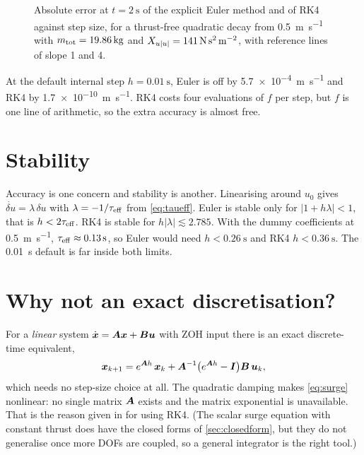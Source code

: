 \begin{figure}[htbp]
\centering
{}
\caption{Absolute error at $t = \qty{2}{\second}$ of the explicit Euler method and of RK4
against step size, for a thrust-free quadratic decay from \qty{0.5}{\meter\per\second} with
$m_\mathrm{tot} = \qty{19.86}{\kilogram}$ and $X_{u|u|} = \qty{141}{\newton\second\squared\per\meter\squared}$,
with reference lines of slope 1 and 4.}
\label{fig:conv}
\end{figure}
\FloatBarrier

At the default internal step $h = \qty{0.01}{\second}$, Euler is off by
\qty{5.7e-4}{\meter\per\second} and RK4 by \qty{1.7e-10}{\meter\per\second}. RK4 costs four
evaluations of $f$ per step, but $f$ is one line of arithmetic, so the extra accuracy is
almost free.

\section{Stability}

Accuracy is one concern and stability is another. Linearising around $u_0$ gives
$\dot{\delta u} = \lambda\,\delta u$ with $\lambda = -1/\tau_\mathrm{eff}$ from \eqref{eq:taueff}. Euler
is stable only for $|1 + h\lambda| < 1$, that is $h < 2\tau_\mathrm{eff}$. RK4 is stable for
$h|\lambda| \lesssim 2.785$. With the dummy coefficients at \qty{0.5}{\meter\per\second},
$\tau_\mathrm{eff} \approx \qty{0.13}{\second}$, so Euler would need $h < \qty{0.26}{\second}$ and
RK4 $h < \qty{0.36}{\second}$. The \qty{0.01}{\second} default is far inside both limits.

\section{Why not an exact discretisation?}

For a \emph{linear} system $\dot{\boldsymbol{x}} = \boldsymbol{A}\boldsymbol{x} + \boldsymbol{B}\boldsymbol{u}$ with ZOH input
there is an exact discrete-time equivalent,
\begin{equation}
  \boldsymbol{x}_{k+1} = e^{\boldsymbol{A}h}\,\boldsymbol{x}_k + \boldsymbol{A}^{-1}\bigl(e^{\boldsymbol{A}h} - \boldsymbol{I}\bigr)\boldsymbol{B}\,\boldsymbol{u}_k,
\end{equation}
which needs no step-size choice at all. The quadratic damping makes \eqref{eq:surge}
nonlinear: no single matrix $\boldsymbol{A}$ exists and the matrix exponential is unavailable. That
is the reason given in  for using RK4. (The scalar surge equation with constant
thrust does have the closed forms of \cref{sec:closedform}, but they do not generalise once
more DOFs are coupled, so a general integrator is the right tool.)

